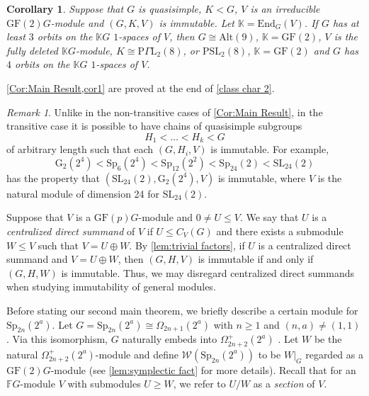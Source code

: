 \documentclass[12pt]{amsart}
\newtheorem{corollary}[theorem]{Corollary}
\theoremstyle{remark}
\newtheorem{remark}[theorem]{Remark}
\theoremstyle{notation}
\theoremstyle{definition}
\newcommand{\G}{\mathrm{G}}
\newcommand{\GF}{\mathrm{GF}}
\newcommand{\Sp}{\mathrm{Sp}}
\newcommand{\SL}{\mathrm{SL}}
\newcommand{\0}{\emptyset}
\newcommand{\PSL}{\mathrm{PSL}}
\newcommand{\Alt}{\mathrm{Alt}}
\begin{document}
\begin{corollary}\label{cor1} Suppose that $G$ is quasisimple, $K <G$, $V$ is an irreducible $\GF(2)G$-module and $(G,K,V)$ is immutable. Let $\mathbb K=\mathrm{End}_G(V)$. If $G$ has at least $3$ orbits on the $\mathbb KG$ $1$-spaces of $V$, then $G \cong \Alt(9)$,  $\mathbb K=\GF(2)$, $V$ is the fully deleted $\mathbb KG$-module, $K \cong \mathrm{P}\Gamma \mathrm L_2(8)$, or $\PSL_2(8)$, $\mathbb K=\GF(2)$ and $G$ has $4$ orbits on the $\mathbb KG$ $1$-spaces of $V$.
\end{corollary}





\cref{Cor:Main Result,cor1} are proved at the end of \cref{class char 2}.



\begin{remark}
Unlike in the non-transitive cases of \cref{Cor:Main Result}, in the transitive case it is possible to have chains of quasisimple subgroups
\[
 H_1 < \dots < H_k < G
\]
of arbitrary length such that each $(G,H_i,V)$ is immutable.
For example,
\[
\G_2(2^4) < \Sp_6(2^4) < \Sp_{12}(2^2) < \Sp_{24}(2) < \SL_{24}(2)
\]
has the property that $(\SL_{24}(2), \G_2(2^4), V)$ is immutable, where $V$ is the natural module of dimension 24 for $\SL_{24}(2)$.
\end{remark}



Suppose that $V$ is a $\GF(p)G$-module and $0 \neq U \le V$.
We say that $U$ is a \emph{centralized direct summand} of $V$ if $U \le C_V(G)$ and there exists a submodule $W \le V$ such that $V = U \oplus W$.
By \cref{lem:trivial factors}, if $U$ is a centralized direct summand and $V = U \oplus W$, then $(G,H,V)$ is immutable if and only if $(G,H,W)$ is immutable.
Thus, we may disregard centralized direct summands when studying immutability of general modules.




Before stating our second main theorem, we briefly describe a certain module for $\Sp_{2n}(2^a)$.
Let $G = \Sp_{2n}(2^a) \cong \Omega_{2n+1}(2^a)$ with $n \ge 1$ and $(n,a) \ne (1,1)$.
Via this isomorphism, $G$ naturally embeds into $\Omega_{2n+2}^+(2^a)$ . Let $W$ be the natural $\Omega_{2n+2}^+(2^a)$-module and define $\mathcal W(\Sp_{2n}(2^a))$ to be $W|_G$ regarded as a $\GF(2)G$-module (see \cref{lem:symplectic fact} for more details). Recall that for an $\mathbb FG$-module $V$ with submodules $U \ge W$, we refer to $U/W$ as a \emph{section} of $V$.
\end{document}
